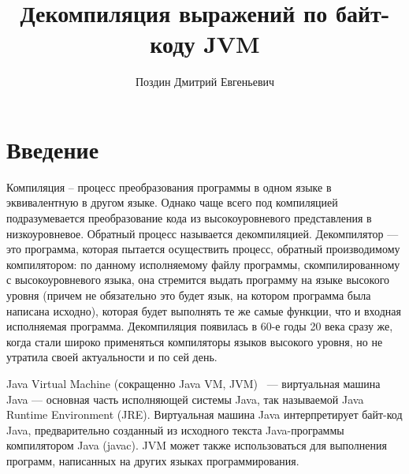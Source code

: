 
\lstset{
language=llang
}

\title{Декомпиляция выражений по байт-коду JVM}
%
\author{Поздин Дмитрий Евгеньевич}
%
%
%

\maketitle              %

\begin{abstract}
\end{abstract}
%



\section*{Введение}

Компиляция -- процесс преобразования программы в одном языке в эквивалентную в другом языке. 
Однако чаще всего под компиляцией подразумевается преобразование кода из высокоуровневого 
представления в низкоуровневое. Обратный процесс называется декомпиляцией. Декомпилятор --- 
это программа, которая пытается осуществить процесс, обратный производимому компилятором: 
по данному исполняемому файлу программы, скомпилированному с высокоуровневого языка, она стремится 
выдать программу на языке высокого уровня (причем не обязательно это будет язык, на котором программа 
была написана исходно), которая будет выполнять те же самые функции, что и входная исполняемая 
программа. Декомпиляция появилась в 60-е годы 20 века сразу же, когда стали широко применяться 
компиляторы языков высокого уровня, но не утратила своей актуальности и по сей день.

Java Virtual Machine (сокращенно Java VM, JVM)~\cite{jvms} --- виртуальная машина Java --- основная часть исполняющей системы 
Java, так называемой Java Runtime Environment (JRE). Виртуальная машина Java интерпретирует байт-код Java, 
предварительно созданный из исходного текста Java-программы компилятором Java (javac). JVM может 
также использоваться для выполнения программ, написанных на других языках программирования.


